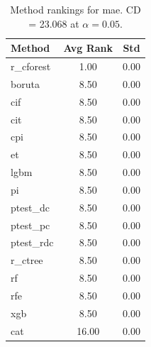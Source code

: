 \begin{table}[h]
\centering
\caption{Method rankings for mae. CD = 23.068 at $\alpha=0.05$.}
\label{tab:ranks_mae}
\begin{tabular}{lcc}
\toprule
Method & Avg Rank & Std \\
\midrule
r_cforest & 1.00 & 0.00 \\
boruta & 8.50 & 0.00 \\
cif & 8.50 & 0.00 \\
cit & 8.50 & 0.00 \\
cpi & 8.50 & 0.00 \\
et & 8.50 & 0.00 \\
lgbm & 8.50 & 0.00 \\
pi & 8.50 & 0.00 \\
ptest_dc & 8.50 & 0.00 \\
ptest_pc & 8.50 & 0.00 \\
ptest_rdc & 8.50 & 0.00 \\
r_ctree & 8.50 & 0.00 \\
rf & 8.50 & 0.00 \\
rfe & 8.50 & 0.00 \\
xgb & 8.50 & 0.00 \\
cat & 16.00 & 0.00 \\
\bottomrule
\end{tabular}
\end{table}
